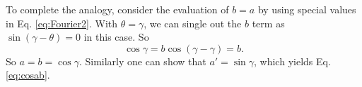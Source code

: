 \documentclass[11pt]{article}
\begin{document}
To complete the analogy,
consider the evaluation of $b = a$
by using special values in
Eq. \eqref{eq:Fourier2}.
%
With $\theta = \gamma$,
we can single out the $b$ term
as $\sin(\gamma - \theta) = 0$
in this case.
%
So
\begin{equation}
  \cos\gamma
=
  b \cos(\gamma - \gamma)
= b.
\end{equation}
So $a = b = \cos\gamma$.
%
Similarly one can show that $a' = \sin\gamma$,
which yields Eq. \eqref{eq:cosab}.
\end{document}
